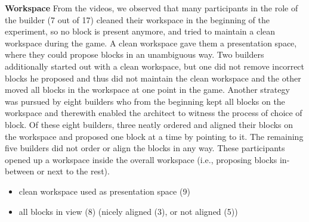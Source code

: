 {\textbf{Workspace} From the videos, we observed that many participants in the role of the builder (7 out of 17) cleaned their workspace in the beginning of the experiment, so no block is present anymore, and tried to maintain a clean workspace during the game. A clean workspace gave them a presentation space, where they could propose blocks in an unambiguous way. Two builders additionally started out with a clean workspace, but one did not remove incorrect blocks he proposed and thus did not maintain the clean workspace and the other moved all blocks in the workspace at one point in the game. Another strategy was pursued by eight builders who from the beginning kept all blocks on the workspace and therewith enabled the architect to witness the process of choice of block. Of these eight builders, three neatly ordered and aligned their blocks on the workspace and proposed one block at a time by pointing to it. The remaining five builders did not order or align the blocks in any way. These participants opened up a workspace inside the overall workspace (i.e., proposing blocks in-between or next to the rest).
\begin{itemize}
\item clean workspace used as presentation space (9)
\item all blocks in view (8) (nicely aligned (3), or not aligned (5))
\end{itemize}

}

